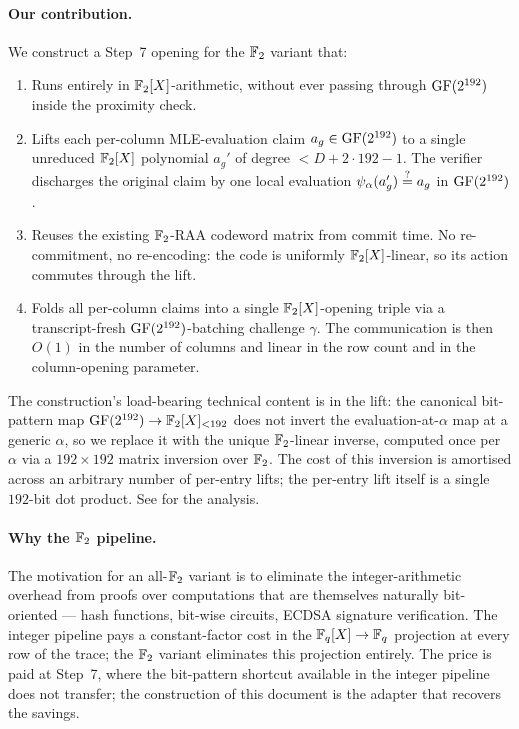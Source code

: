 \paragraph{Our contribution.} We construct a Step~7 opening for the
$\mathbb{F}_2$ variant that:
\begin{enumerate}[leftmargin=2em]
  \item Runs entirely in $\mathbb{F}_2[X]$-arithmetic, without ever passing
    through $\mathrm{GF}(2^{192})$ inside the proximity check.
  \item Lifts each per-column MLE-evaluation claim $a_g \in \mathrm{GF}(2^{192})$
    to a single unreduced $\mathbb{F}_2[X]$ polynomial $a_g'$ of degree
    $< D + 2\cdot 192 - 1$. The verifier discharges the original claim
    by one local evaluation $\psi_{\alpha}(a_g') \stackrel{?}{=} a_g$ in
    $\mathrm{GF}(2^{192})$.
  \item Reuses the existing $\mathbb{F}_2$-RAA codeword matrix from commit
    time. No re-commitment, no re-encoding: the code is uniformly
    $\mathbb{F}_2[X]$-linear, so its action commutes through the lift.
  \item Folds all per-column claims into a single $\mathbb{F}_2[X]$-opening
    triple via a transcript-fresh $\mathrm{GF}(2^{192})$-batching challenge
    $\gamma$. The communication is then $O(1)$ in the number of
    columns and linear in the row count and in the column-opening
    parameter.
\end{enumerate}
The construction's load-bearing technical content is in the lift: the
canonical bit-pattern map $\mathrm{GF}(2^{192}) \to \mathbb{F}_2[X]_{<192}$ does not invert
the evaluation-at-$\alpha$ map at a generic $\alpha$, so we replace it
with the unique $\mathbb{F}_2$-linear inverse, computed once per $\alpha$ via
a $192 \times 192$ matrix inversion over $\mathbb{F}_2$. The cost of this
inversion is amortised across an arbitrary number of per-entry lifts;
the per-entry lift itself is a single $192$-bit dot product. See
 for the analysis.

\paragraph{Why the $\mathbb{F}_2$ pipeline.} The motivation for an all-$\mathbb{F}_2$
variant is to eliminate the integer-arithmetic overhead from
proofs over computations that are themselves naturally bit-oriented
— hash functions, bit-wise circuits, ECDSA signature verification.
The integer pipeline pays a constant-factor cost in the
$\mathbb{F}_q[X]\to\mathbb{F}_q$ projection at every row of the trace; the $\mathbb{F}_2$
variant eliminates this projection entirely. The price is paid at
Step~7, where the bit-pattern shortcut available in the integer
pipeline does not transfer; the construction of this document is the
adapter that recovers the savings.

